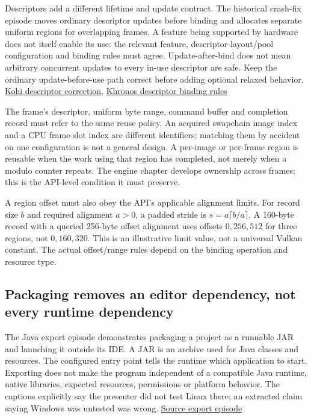 Descriptors add a different lifetime and update contract. The historical crash-fix episode moves ordinary descriptor updates before binding and allocates separate uniform regions for overlapping frames. A feature being supported by hardware does not itself enable its use: the relevant feature, descriptor-layout/pool configuration and binding rules must agree. Update-after-bind does not mean arbitrary concurrent updates to every in-use descriptor are safe. Keep the ordinary update-before-use path correct before adding optional relaxed behavior. \href{https://www.youtube.com/watch?v=U4QvUeUL37Y}{Kohi descriptor correction}, \href{https://docs.vulkan.org/spec/latest/chapters/descriptorsets.html}{Khronos descriptor binding rules}

The frame's descriptor, uniform byte range, command buffer and completion record must refer to the same reuse policy. An acquired swapchain image index and a CPU frame-slot index are different identifiers; matching them by accident on one configuration is not a general design. A per-image or per-frame region is reusable when the work using that region has completed, not merely when a modulo counter repeats. The engine chapter develops ownership across frames; this is the API-level condition it must preserve.

A region offset must also obey the API's applicable alignment limits. For record size \(b\) and required alignment \(a>0\), a padded stride is \(s=a\lceil b/a\rceil\). A 160-byte record with a queried 256-byte offset alignment uses offsets \(0,256,512\) for three regions, not \(0,160,320\). This is an illustrative limit value, not a universal Vulkan constant. The actual offset/range rules depend on the binding operation and resource type.

\subsection{Packaging removes an editor dependency, not every runtime dependency}\label{01-foundations-i-ch008-packaging-removes-an-editor-dependency-not-every-runtime-dependency}

The Java export episode demonstrates packaging a project as a runnable JAR and launching it outside its IDE. A JAR is an archive used for Java classes and resources. The configured entry point tells the runtime which application to start. Exporting does not make the program independent of a compatible Java runtime, native libraries, expected resources, permissions or platform behavior. The captions explicitly say the presenter did not test Linux there; an extracted claim saying Windows was untested was wrong. \href{https://www.youtube.com/watch?v=velhSXA2CnQ}{Source export episode}

